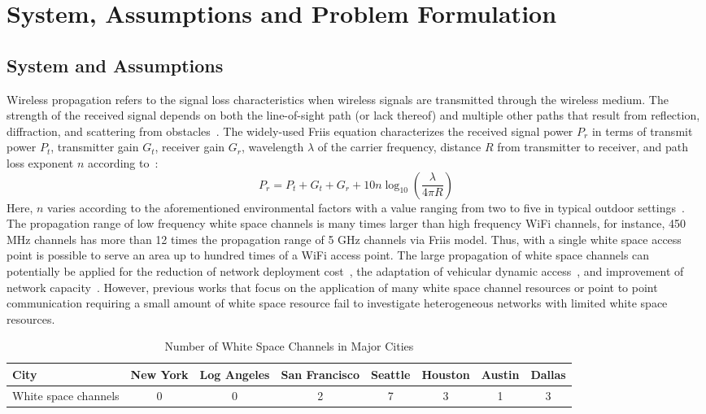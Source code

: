 \section{System, Assumptions and Problem Formulation}
\label{sec:problemformulation}

\subsection{System and Assumptions}
\label{subsec:model}
Wireless propagation refers to the signal loss characteristics when wireless signals 
are transmitted through the wireless medium. The strength of the received signal depends on 
both the line-of-sight path (or lack thereof) and multiple other paths that result from reflection, 
diffraction, and scattering from obstacles~\cite{andersen1995propagation}. The widely-used Friis
equation characterizes the received signal power $P_r$ in terms of transmit power $P_t$, transmitter 
gain $G_t$, receiver gain $G_r$, wavelength $\lambda$ of the carrier frequency, distance $R$ from 
transmitter to receiver, and path loss exponent $n$ according to~\cite{friis}:
\begin{equation}
\label{eq:friis}
P_r=P_t+G_t+G_r+10n \log_{10}\left( \frac{\lambda}{4\pi R}\right)
\end{equation}
Here, $n$ varies according to the aforementioned environmental 
factors with a value ranging from two to five in typical outdoor 
settings~\cite{rappaport}.
The propagation range of low frequency white space channels is many times larger than high frequency WiFi channels, for instance, 
450 MHz channels has more than 12 times the propagation range of 5 GHz channels via Friis model. Thus, with a 
single white space access point is possible to serve an area up to hundred times of a WiFi access point. 
The large propagation of white space channels can potentially be applied for the reduction of network deployment 
cost~\cite{pcuiwinmee}, the adaptation of vehicular dynamic access~\cite{chen2011feasibility}, and improvement 
of network capacity~\cite{bahl2009white}.
However, previous works that focus on the application of many white space channel resources or point to point 
communication requiring a small amount of white space resource fail to investigate heterogeneous networks 
with limited white space resources.

\begin{table}[hpt]
\centering %
\begin{tabular}{|l|c|c|c|c|c|c|c|} %
\hline %
City & New York & Log Angeles & San Francisco & Seattle & Houston & Austin & Dallas \\
\hline %
White space channels & 0 & 0 & 2 & 7 & 3 & 1& 3 \\
\hline %
\end{tabular}    
\caption{Number of White Space Channels in Major Cities} %
\label{tab:whitespacechannel}    
\vspace{-0.3in}
\end{table}    

